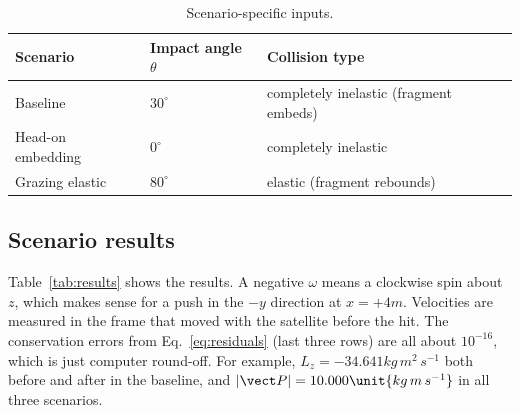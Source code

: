 \begin{table}[H]
  \centering\footnotesize
  \caption{Scenario-specific inputs.}
  \label{tab:scenarios}
  \begin{tabular}{@{}lll@{}}
    \toprule
    Scenario & Impact angle $\theta$ & Collision type \\
    \midrule
    Baseline & $30^\circ$ & completely inelastic (fragment embeds) \\
    Head-on embedding & $0^\circ$ & completely inelastic \\
    Grazing elastic & $80^\circ$ & elastic (fragment rebounds) \\
    \bottomrule
  \end{tabular}
\end{table}

\subsection{Scenario results}

Table~\ref{tab:results} shows the results. A negative $\omega$ means a
clockwise spin about $z$, which makes sense for a push in the $-y$
direction at $x=+4\unit{m}$. Velocities are measured in the frame that
moved with the satellite before the hit. The conservation errors from
Eq.~\eqref{eq:residuals} (last three rows) are all about $10^{-16}$, which
is just computer round-off. For example, $L_z=-34.641\unit{kg\,m^2\,s^{-1}}$
both before and after in the baseline, and $|\vect P|=10.000\unit{kg\,m\,s^{-1}}$
in all three scenarios.

